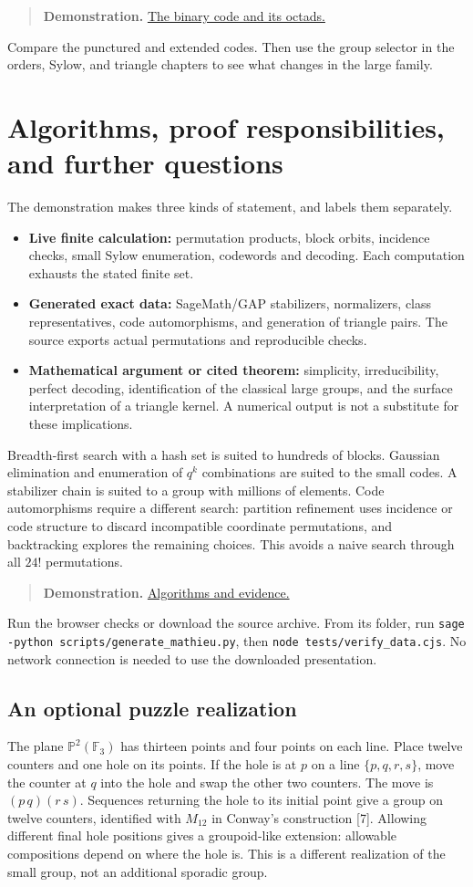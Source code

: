 \documentclass[12pt,letterpaper]{article}
\theoremstyle{definition}
\theoremstyle{remark}
\newenvironment{toolnote}{\begin{quote}\small\color{navy}}{\end{quote}}
\newcommand{\F}{\mathbb F}\newcommand{\Z}{\mathbb Z}
\newcommand{\pageheading}[1]{\clearpage\section{#1}}
\newcommand{\demolink}[2]{\href{https://gtevelev-max.github.io/mathieu/\##1}{#2}}
\newcommand{\demobox}[2]{\begin{toolnote}\textbf{Demonstration.} \demolink{#1}{#2}\end{toolnote}}
\begin{document}
\demobox{codes?group=24}{The binary code and its octads.} Compare the punctured and extended codes. Then use the group selector in the orders, Sylow, and triangle chapters to see what changes in the large family.

\hypertarget{methods}{}
\pageheading{Algorithms, proof responsibilities, and further questions}
The demonstration makes three kinds of statement, and labels them separately.
\begin{itemize}[leftmargin=*,itemsep=4pt]
\item \textbf{Live finite calculation:} permutation products, block orbits, incidence checks, small Sylow enumeration, codewords and decoding. Each computation exhausts the stated finite set.
\item \textbf{Generated exact data:} SageMath/GAP stabilizers, normalizers, class representatives, code automorphisms, and generation of triangle pairs. The source exports actual permutations and reproducible checks.
\item \textbf{Mathematical argument or cited theorem:} simplicity, irreducibility, perfect decoding, identification of the classical large groups, and the surface interpretation of a triangle kernel. A numerical output is not a substitute for these implications.
\end{itemize}
Breadth-first search with a hash set is suited to hundreds of blocks. Gaussian elimination and enumeration of $q^k$ combinations are suited to the small codes. A stabilizer chain is suited to a group with millions of elements. Code automorphisms require a different search: partition refinement uses incidence or code structure to discard incompatible coordinate permutations, and backtracking explores the remaining choices. This avoids a naive search through all $24!$ permutations.

\demobox{methods}{Algorithms and evidence.} Run the browser checks or download the source archive. From its folder, run \texttt{sage -python scripts/generate\_mathieu.py}, then \texttt{node tests/verify\_data.cjs}. No network connection is needed to use the downloaded presentation.

\subsection*{An optional puzzle realization}
The plane $\mathbb P^2(\F_3)$ has thirteen points and four points on each line. Place twelve counters and one hole on its points. If the hole is at $p$ on a line $\{p,q,r,s\}$, move the counter at $q$ into the hole and swap the other two counters. The move is $(p\,q)(r\,s)$. Sequences returning the hole to its initial point give a group on twelve counters, identified with $M_{12}$ in Conway's construction [7]. Allowing different final hole positions gives a groupoid-like extension: allowable compositions depend on where the hole is. This is a different realization of the small group, not an additional sporadic group.
\end{document}
